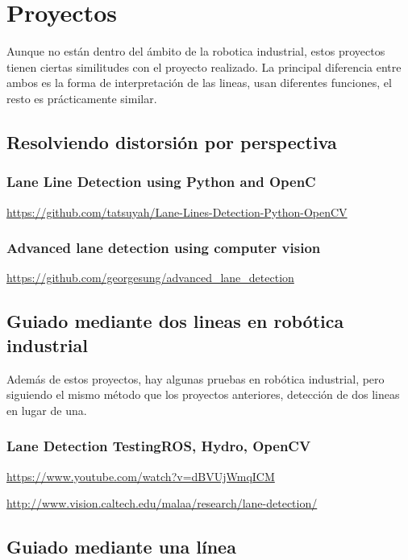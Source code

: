 \section{Proyectos}

Aunque no están dentro del ámbito de la robotica industrial, estos proyectos tienen ciertas similitudes con el proyecto realizado. La principal diferencia entre ambos es la forma de interpretación de las lineas, usan diferentes funciones, el resto es prácticamente similar.

\subsection{Resolviendo distorsión por perspectiva}

\subsubsection{Lane Line Detection using Python and OpenC}

\url{https://github.com/tatsuyah/Lane-Lines-Detection-Python-OpenCV}

\subsubsection{Advanced lane detection using computer vision}
\url{https://github.com/georgesung/advanced_lane_detection}


\subsection{Guiado mediante dos lineas en robótica industrial}

Además de estos proyectos, hay algunas pruebas en robótica industrial, pero siguiendo el mismo método que los proyectos anteriores, detección de dos lineas en lugar de una.


\subsubsection{Lane Detection TestingROS, Hydro, OpenCV}

\url{https://www.youtube.com/watch?v=dBVUjWmqICM}

\url{http://www.vision.caltech.edu/malaa/research/lane-detection/}


\subsection{Guiado mediante una línea}

